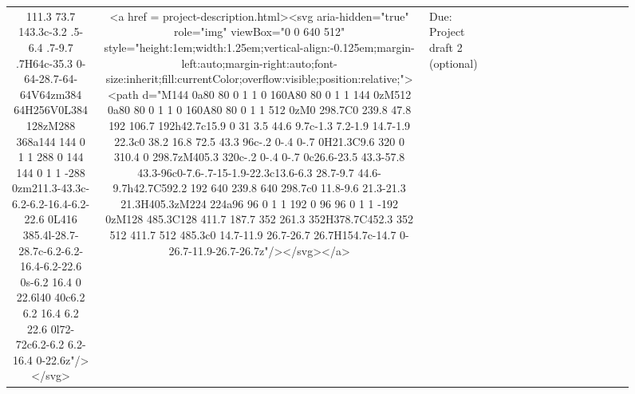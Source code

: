\documentclass[
]{article}
\begin{document}
\begin{figure*}
\begin{longtable*}{cclllccccccccccl}
111.3 73.7 143.3c-3.2 .5-6.4 .7-9.7 .7H64c-35.3 0-64-28.7-64-64V64zm384 64H256V0L384 128zM288 368a144 144 0 1 1 288 0 144 144 0 1 1 -288 0zm211.3-43.3c-6.2-6.2-16.4-6.2-22.6 0L416 385.4l-28.7-28.7c-6.2-6.2-16.4-6.2-22.6 0s-6.2 16.4 0 22.6l40 40c6.2 6.2 16.4 6.2 22.6 0l72-72c6.2-6.2 6.2-16.4 0-22.6z"/></svg> & <a href = project-description.html><svg aria-hidden="true" role="img" viewBox="0 0 640 512" style="height:1em;width:1.25em;vertical-align:-0.125em;margin-left:auto;margin-right:auto;font-size:inherit;fill:currentColor;overflow:visible;position:relative;"><path d="M144 0a80 80 0 1 1 0 160A80 80 0 1 1 144 0zM512 0a80 80 0 1 1 0 160A80 80 0 1 1 512 0zM0 298.7C0 239.8 47.8 192 106.7 192h42.7c15.9 0 31 3.5 44.6 9.7c-1.3 7.2-1.9 14.7-1.9 22.3c0 38.2 16.8 72.5 43.3 96c-.2 0-.4 0-.7 0H21.3C9.6 320 0 310.4 0 298.7zM405.3 320c-.2 0-.4 0-.7 0c26.6-23.5 43.3-57.8 43.3-96c0-7.6-.7-15-1.9-22.3c13.6-6.3 28.7-9.7 44.6-9.7h42.7C592.2 192 640 239.8 640 298.7c0 11.8-9.6 21.3-21.3 21.3H405.3zM224 224a96 96 0 1 1 192 0 96 96 0 1 1 -192 0zM128 485.3C128 411.7 187.7 352 261.3 352H378.7C452.3 352 512 411.7 512 485.3c0 14.7-11.9 26.7-26.7 26.7H154.7c-14.7 0-26.7-11.9-26.7-26.7z"/></svg></a> & Due: Project draft 2 (optional) \\ 

\end{longtable*}
\end{figure*}
\end{document}
